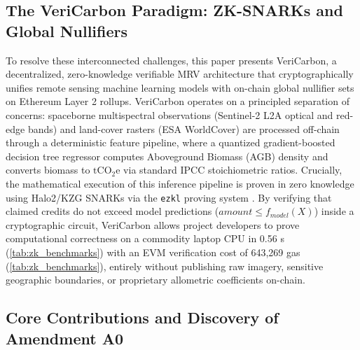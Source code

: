 \documentclass[preprint,12pt]{elsarticle}
\begin{document}
\subsection{The VeriCarbon Paradigm: ZK-SNARKs and Global Nullifiers}

To resolve these interconnected challenges, this paper presents VeriCarbon, a decentralized, zero-knowledge verifiable MRV architecture that cryptographically unifies remote sensing machine learning models with on-chain global nullifier sets on Ethereum Layer 2 rollups. VeriCarbon operates on a principled separation of concerns: spaceborne multispectral observations (Sentinel-2 L2A optical and red-edge bands) and land-cover rasters (ESA WorldCover) are processed off-chain through a deterministic feature pipeline, where a quantized gradient-boosted decision tree regressor computes Aboveground Biomass (AGB) density and converts biomass to $\text{tCO}_2\text{e}$ via standard IPCC stoichiometric ratios. Crucially, the mathematical execution of this inference pipeline is proven in zero knowledge using Halo2/KZG SNARKs via the \texttt{ezkl} proving system \cite{ezkl2023engine,bowe2020halo}. By verifying that claimed credits do not exceed model predictions ($amount \le f_{model}(X)$) inside a cryptographic circuit, VeriCarbon allows project developers to prove computational correctness on a commodity laptop CPU in 0.56 s (\autoref{tab:zk_benchmarks}) with an EVM verification cost of 643,269 gas (\autoref{tab:zk_benchmarks}), entirely without publishing raw imagery, sensitive geographic boundaries, or proprietary allometric coefficients on-chain.

\subsection{Core Contributions and Discovery of Amendment A0}
\end{document}
